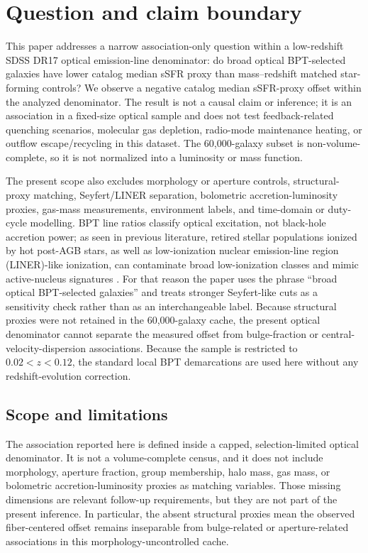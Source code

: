 \documentclass[twocolumn]{aastex631}
\begin{document}

\section{Question and claim boundary}
This paper addresses a narrow association-only question within a low-redshift SDSS DR17 optical emission-line denominator: do broad optical BPT-selected galaxies have lower catalog median sSFR proxy than mass--redshift matched star-forming controls? We observe a negative catalog median sSFR-proxy offset within the analyzed denominator. The result is not a causal claim or inference; it is an association in a fixed-size optical sample and does not test feedback-related quenching scenarios, molecular gas depletion, radio-mode maintenance heating, or outflow escape/recycling in this dataset. The 60,000-galaxy subset is non-volume-complete, so it is not normalized into a luminosity or mass function.


The present scope also excludes morphology or aperture controls, structural-proxy matching, Seyfert/LINER separation, bolometric accretion-luminosity proxies, gas-mass measurements, environment labels, and time-domain or duty-cycle modelling. BPT line ratios classify optical excitation, not black-hole accretion power; as seen in previous literature, retired stellar populations ionized by hot post-AGB stars, as well as low-ionization nuclear emission-line region (LINER)-like ionization, can contaminate broad low-ionization classes and mimic active-nucleus signatures \citep{cidfernandes2011,stasinska2008,stasinska2015}. For that reason the paper uses the phrase ``broad optical BPT-selected galaxies'' and treats stronger Seyfert-like cuts as a sensitivity check rather than as an interchangeable label. Because structural proxies were not retained in the 60,000-galaxy cache, the present optical denominator cannot separate the measured offset from bulge-fraction or central-velocity-dispersion associations. Because the sample is restricted to $0.02<z<0.12$, the standard local BPT demarcations are used here without any redshift-evolution correction.

\subsection{Scope and limitations}
The association reported here is defined inside a capped, selection-limited optical denominator. It is not a volume-complete census, and it does not include morphology, aperture fraction, group membership, halo mass, gas mass, or bolometric accretion-luminosity proxies as matching variables. Those missing dimensions are relevant follow-up requirements, but they are not part of the present inference. In particular, the absent structural proxies mean the observed fiber-centered offset remains inseparable from bulge-related or aperture-related associations in this morphology-uncontrolled cache.
\end{document}
